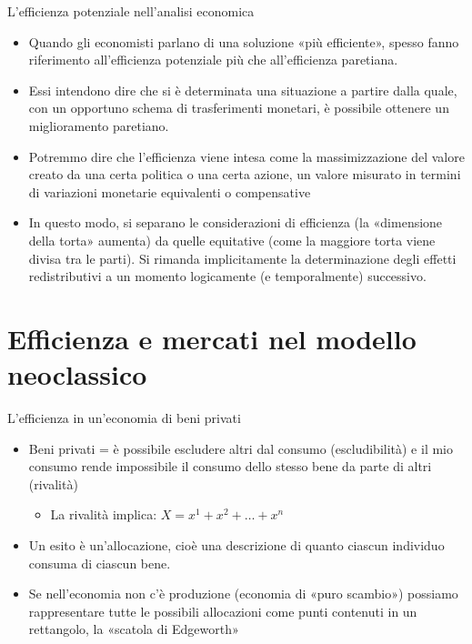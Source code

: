 \documentclass[aspectratio=149,11pt]{beamer}
\begin{document}
\begin{frame}{L'efficienza potenziale nell'analisi economica}
\begin{itemize}
\item Quando gli economisti parlano di una soluzione «più efficiente», spesso fanno riferimento all’efficienza potenziale più che all’efficienza paretiana.
\item Essi intendono dire che si è determinata una situazione a partire dalla quale, con un opportuno schema di trasferimenti monetari, è possibile ottenere un miglioramento paretiano.
\item Potremmo dire che l’efficienza viene intesa come la massimizzazione del valore creato da una certa politica o una certa azione, un valore misurato in termini di variazioni monetarie equivalenti o compensative
\item In questo modo, si separano le considerazioni di efficienza (la «dimensione della torta» aumenta) da quelle equitative (come la maggiore torta viene divisa tra le parti). Si rimanda implicitamente la determinazione degli effetti redistributivi a un momento logicamente (e temporalmente) successivo.
\end{itemize}
\end{frame}
\section{Efficienza e mercati nel modello neoclassico}

\begin{frame}{L'efficienza in un'economia di beni privati}
\begin{itemize}
\item \alert{Beni privati} = è possibile escludere altri dal consumo (escludibilità) e il
mio consumo rende impossibile il consumo dello stesso bene da parte di altri
(rivalità)
\begin{itemize}
\item La rivalità implica: $X = x^1 + x^2 + \dots + x^n$
\end{itemize}
\item Un esito è un'\alert{allocazione}, cioè una descrizione di quanto ciascun individuo
consuma di ciascun bene.
\item Se nell’economia non c’è produzione (economia di «puro scambio») possiamo
rappresentare tutte le possibili allocazioni come punti contenuti in un
rettangolo, la «scatola di Edgeworth»
\end{itemize}
\end{frame}
\end{document}
